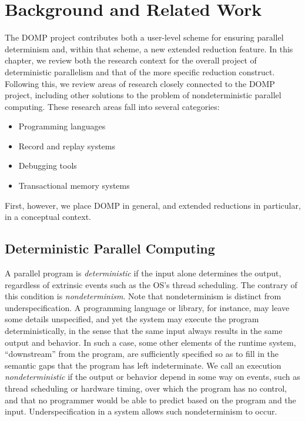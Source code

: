 %
%
\chapter{Background and Related Work}
\label{chap:background}
%
The DOMP project contributes both a user-level scheme for ensuring parallel determinism and, within that scheme, a new extended reduction feature.  In this chapter, we review both the research context for the overall project of deterministic parallelism and that of the more specific reduction construct.  Following this, we review areas of research closely connected to the DOMP project, including other solutions to the problem of nondeterministic parallel computing.  These research areas fall into several categories:
\begin{itemize}
\item Programming languages
\item Record and replay systems
\item Debugging tools
\item Transactional memory systems
\end{itemize}
First, however, we place DOMP in general, and extended reductions in particular, in a conceptual context.

\section{Deterministic Parallel Computing}
\label{sec:background-determ}
%
A parallel program is \textit{deterministic} if the input alone determines the output, regardless of extrinsic events such as the OS's thread scheduling.  
The contrary of this condition is \textit{nondeterminism}.  Note that nondeterminism is distinct from underspecification.  A programming language or library, for instance, may leave some details unspecified, and yet the system may execute the program deterministically, in the sense that the same input always results in the same output and behavior.  In such a case, some other elements of the runtime system, ``downstream'' from the program, are sufficiently specified so as to fill in the semantic gaps that the program has left indeterminate.   We call an execution \textit{nondeterministic} if the output or behavior depend in some way on events, such as thread scheduling or hardware timing, over which the program has no control, and that no programmer would be able to predict based on the program and the input.  Underspecification in a system allows such nondeterminism to occur.

